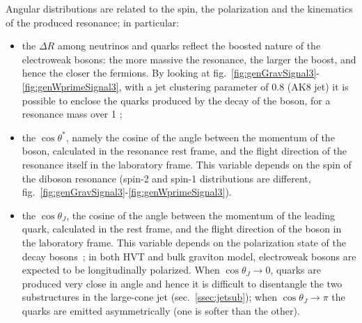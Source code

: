 \noindent Angular distributions are related to the spin, the polarization and the kinematics of the produced resonance; in particular:
\begin{itemize}
\item the $\Delta R$ among neutrinos and quarks reflect the boosted nature of the electroweak bosons: the more massive the resonance, the larger the boost, and hence the closer the fermions. By looking at fig.~\ref{fig:genGravSignal3}-\ref{fig:genWprimeSignal3}, with a jet clustering parameter of 0.8 (AK8 jet) it is possible to enclose the quarks produced by the decay of the \V boson, for a resonance mass over 1 \TeV;
\item the $\cos{\theta}^{*}$, namely the cosine of the angle between the momentum of the \V boson, calculated in the resonance rest frame, and the flight direction of the resonance itself in the laboratory frame. This variable depends on the spin of the diboson resonance (spin-2 and spin-1 distributions are different, fig.~\ref{fig:genGravSignal3}-\ref{fig:genWprimeSignal3}). %
\item the $\cos{\theta}_J$, the cosine of the angle between the momentum of the leading quark, calculated in the \V rest frame, and the flight direction of the \V boson in the laboratory frame. This variable depends on the polarization state of the decay bosons~\cite{Khachatryan:2014vla}; in both HVT and bulk graviton model, electroweak bosons are expected to be longitudinally polarized. When $\cos{\theta}_J \rightarrow 0$, quarks are produced very close in angle and hence it is difficult to disentangle the two substructures in the large-cone jet (sec.~\ref{ssec:jetsub}); when $\cos{\theta}_J \rightarrow \pi$ the quarks are emitted asymmetrically (one is softer than the other).%
\end{itemize}
 


